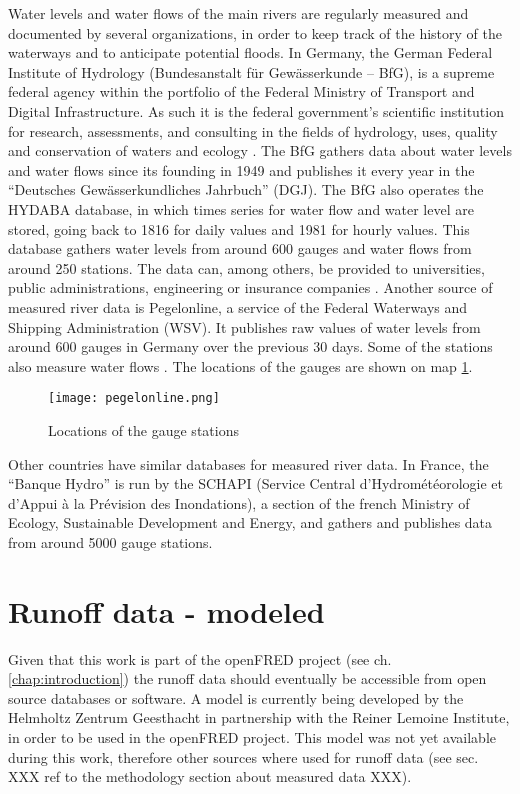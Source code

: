 \label{meas_runoff}
Water levels and water flows of the main rivers are regularly measured and documented by several organizations, in order to keep track of the history of the waterways and to anticipate potential floods. In Germany, the German Federal Institute of Hydrology (Bundesanstalt für Gewässerkunde – BfG), is a supreme federal agency within the portfolio of the Federal Ministry of Transport and Digital Infrastructure. As such it is the federal government's scientific institution for research, assessments, and consulting in the fields of hydrology, uses, quality and conservation of waters and ecology \cite{bafg}. The BfG gathers data about water levels and water flows since its founding in 1949 and publishes it every year in the ``Deutsches Gewässerkundliches Jahrbuch'' (DGJ). The BfG also operates the HYDABA database, in which times series for water flow and water level are stored, going back to 1816 for daily values and 1981 for hourly values. This database gathers water levels from around 600 gauges and water flows from around 250 stations. The data can, among others, be provided to universities, public administrations, engineering or insurance companies \cite{bafg_hyd}. \newline
Another source of measured river data is Pegelonline, a service of the Federal Waterways and Shipping Administration (WSV). It publishes raw values of water levels from around 600 gauges in Germany over the previous 30 days. Some of the stations also measure water flows \cite{pegelonline}. The locations of the gauges are shown on map \ref{pegelonline}.

\begin{figure}[H]
\centering
\texttt{[image: pegelonline.png]}
\caption[Locations of the gauge stations]{Locations of the gauge stations \cite{pegelonline}}
\label{pegelonline}
\end{figure}

Other countries have similar databases for measured river data. In France, the ``Banque Hydro'' is run by the SCHAPI (Service Central d'Hydrométéorologie et d'Appui à la Prévision des Inondations), a section of the french Ministry of Ecology, Sustainable Development and Energy, and gathers and publishes data from around 5000 gauge stations.

\section{Runoff data - modeled}

Given that this work is part of the openFRED project (see ch. \ref{chap:introduction}) the runoff data should eventually be accessible from open source databases or software. A model is currently being developed by the Helmholtz Zentrum Geesthacht in partnership with the Reiner Lemoine Institute, in order to be used in the openFRED project. This model was not yet available during this work, therefore other sources where used for runoff data (see sec. XXX ref to the methodology section about measured data XXX).
